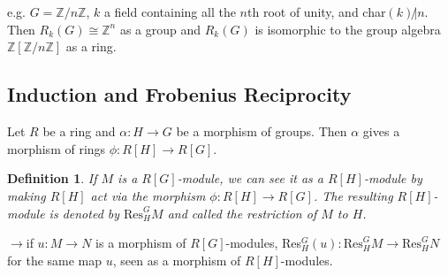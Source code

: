 \documentclass[12pt,letterpaper]{report}
\newtheorem{definition}{Definition}[section]
\begin{document}
\\\\e.g. $G=\mathbb{Z}/n\mathbb{Z}$, $k$ a field containing all the $n$th root of unity, and char$(k)\not|n$. Then $R_{k}(G)\cong\mathbb{Z}^{n}$ as a group and $R_{k}(G)$ is isomorphic to the group algebra $\mathbb{Z}[\mathbb{Z}/n\mathbb{Z}]$ as a ring. 

\subsection{Induction and Frobenius Reciprocity}

Let $R$ be a ring and $\alpha:H\rightarrow G$ be a morphism of groups. Then $\alpha$ gives a morphism of rings $\phi:R[H]\rightarrow R[G]$. 
\begin{definition}If $M$ is a $R[G]$-module, we can see it as a $R[H]$-module by making $R[H]$ act via the morphism $\phi:R[H]\rightarrow R[G]$. The resulting $R[H]$-module is denoted by $\text{Res}_{H}^{G}M$ and called the restriction of $M$ to $H$.\end{definition}
$\rightarrow $if $u:M\rightarrow N$ is a morphism of $R[G]$-modules, Res$_{H}^{G}(u):\text{Res}_{H}^{G}M\rightarrow\text{Res}_{H}^{G}N$ for the same map $u$, seen as a morphism of $R[H]$-modules.
\end{document}
